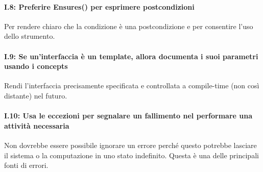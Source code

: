 \paragraph{I.8: Preferire \textbf{Ensures()} per esprimere postcondizioni}

\textsf{\small Per rendere chiaro che la condizione è una postcondizione e per consentire l'uso dello strumento.} \\ %

\paragraph{I.9: Se un'interfaccia è un template, allora documenta i suoi parametri usando i concepts}

\textsf{\small Rendi l'interfaccia precisamente specificata e controllata a compile-time (non così distante) nel futuro.} \\

\paragraph{I.10: Usa le eccezioni per segnalare un fallimento nel performare una attività necessaria}

\textsf{\small Non dovrebbe essere possibile ignorare un errore perché questo potrebbe lasciare il sistema o la computazione in uno stato indefinito. Questa è una delle principali fonti di errori.} \\

